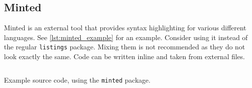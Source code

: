

\subsection{Minted}

Minted is an external tool that provides syntax highlighting for various different languages.
See \cref{lst:minted_example} for an example.
Consider using it instead of the regular \texttt{listings} package.
Mixing them is not recommended as they do not look exactly the same.
Code can be written inline and taken from external files.

\begin{listing}
	\capstart
	\inputminted{haskell}{code/sample.hs}
	\caption{Example source code, using the \texttt{minted} package.}
	\label{lst:minted_example}
\end{listing}
